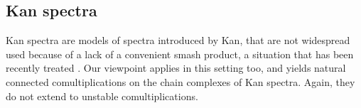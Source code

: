 

\subsection{Kan spectra} Kan spectra \cite{Kan1963} are models of spectra introduced by Kan, that are not widespread used because of a lack of a convenient smash product, a situation that has been recently treated \cite{CKP2023}. Our viewpoint applies in this setting too, and yields natural connected comultiplications on the chain complexes of Kan spectra. Again, they do not extend to unstable comultiplications.



